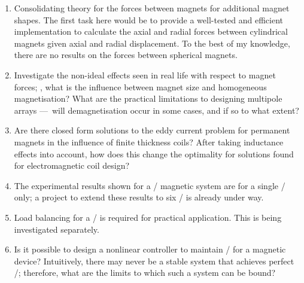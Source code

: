 \begin{enumerate}
\item
Consolidating theory for the forces between magnets for additional magnet shapes.
The first task here would be to provide a well-tested and efficient implementation to calculate the axial and radial forces between cylindrical magnets given axial and radial displacement.
To the best of my knowledge, there are no results on the forces between spherical magnets.

\item
Investigate the non-ideal effects seen in real life with respect to magnet forces; \eg, what is the influence between magnet size and homogeneous magnetisation?
What are the practical limitations to designing multipole arrays — will demagnetisation occur in some cases, and if so to what extent?

\item
Are there closed form solutions to the eddy current problem for permanent magnets in the influence of finite thickness coils?
After taking inductance effects into account, how does this change the optimality for solutions found for electromagnetic coil design?

\item
The experimental results shown for a \qzs/ magnetic system are for a single \dof/ only; a project to extend these results to six \dof/ is already under way.

\item
Load balancing for a \qzs/ is required for practical application.
This is being investigated separately.

\item
Is it possible to design a nonlinear controller to maintain \qzs/ for a magnetic device?
Intuitively, there may never be a stable system that achieves perfect \qzs/; therefore, what are the limits to which such a system can be bound?

\end{enumerate}

